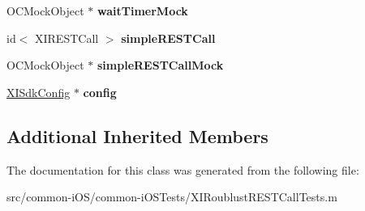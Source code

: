 \begin{DoxyCompactItemize}
O\+C\+Mock\+Object $\ast$ {\bfseries wait\+Timer\+Mock}
\item 
\hypertarget{interface_x_i_roublust_r_e_s_t_call_tests_ae785de30d1ed97e9c948a5c7de1dfd8a}{}\label{interface_x_i_roublust_r_e_s_t_call_tests_ae785de30d1ed97e9c948a5c7de1dfd8a} 
id$<$ X\+I\+R\+E\+S\+T\+Call $>$ {\bfseries simple\+R\+E\+S\+T\+Call}
\item 
\hypertarget{interface_x_i_roublust_r_e_s_t_call_tests_accad7fd86c050165b76383df18cfeee9}{}\label{interface_x_i_roublust_r_e_s_t_call_tests_accad7fd86c050165b76383df18cfeee9} 
O\+C\+Mock\+Object $\ast$ {\bfseries simple\+R\+E\+S\+T\+Call\+Mock}
\item 
\hypertarget{interface_x_i_roublust_r_e_s_t_call_tests_ac03fb2bf1091aaeb001388b409515907}{}\label{interface_x_i_roublust_r_e_s_t_call_tests_ac03fb2bf1091aaeb001388b409515907} 
\hyperlink{class_x_i_sdk_config}{X\+I\+Sdk\+Config} $\ast$ {\bfseries config}
\end{DoxyCompactItemize}
\subsection*{Additional Inherited Members}


The documentation for this class was generated from the following file\+:\begin{DoxyCompactItemize}
\item 
src/common-\/i\+O\+S/common-\/i\+O\+S\+Tests/X\+I\+Roublust\+R\+E\+S\+T\+Call\+Tests.\+m\end{DoxyCompactItemize}

